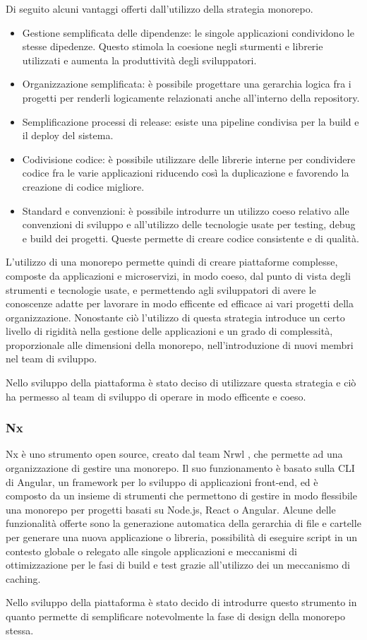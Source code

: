 Di seguito alcuni vantaggi offerti dall'utilizzo della strategia monorepo.\cite{Monorepo}
\begin{itemize}
      \item Gestione semplificata delle dipendenze: le singole applicazioni condividono le stesse dipedenze.
            Questo stimola la coesione negli sturmenti e librerie utilizzati e
            aumenta la produttività degli sviluppatori.
      \item Organizzazione semplificata: è possibile progettare una
            gerarchia logica fra i progetti per renderli logicamente
            relazionati anche all'interno della repository.
      \item Semplificazione processi di release: esiste una pipeline condivisa per la build e il deploy del sistema.
      \item Codivisione codice: è possibile utilizzare delle librerie interne per condividere codice fra le varie applicazioni riducendo
            così la duplicazione e favorendo la creazione di codice migliore.
      \item Standard e convenzioni: è possibile introdurre un utilizzo coeso relativo alle convenzioni di sviluppo e all'utilizzo delle tecnologie
            usate per testing, debug e build dei progetti. Queste permette di creare codice consistente e di qualità.

\end{itemize}
L'utilizzo di una monorepo permette quindi di creare piattaforme complesse, composte da applicazioni e microservizi, in modo
coeso, dal punto di vista degli strumenti e tecnologie usate, e permettendo agli sviluppatori di avere le conoscenze adatte per lavorare
in modo efficente ed efficace ai vari progetti della organizzazione.
Nonostante ciò l'utilizzo di questa strategia introduce un certo livello di rigidità nella gestione delle applicazioni e un
grado di complessità, proporzionale alle dimensioni della monorepo, nell'introduzione di nuovi membri nel team di sviluppo.

Nello sviluppo della piattaforma è stato deciso di utilizzare questa strategia e ciò ha permesso
al team di sviluppo di operare in modo efficente e coeso.

\subsubsection{Nx}
Nx \cite{Nx} è uno strumento open source, creato dal team Nrwl \cite{Nrwl}, che permette ad una organizzazione
di gestire una monorepo.
Il suo funzionamento è basato sulla CLI di Angular, un framework per lo sviluppo di applicazioni front-end,
ed è composto da un insieme di strumenti che permettono di gestire in modo flessibile una monorepo per progetti basati
su Node.js, React o Angular. Alcune delle funzionalità offerte sono la generazione automatica della gerarchia di file e cartelle
per generare una nuova applicazione o libreria, possibilità di eseguire script in un contesto globale o relegato alle singole applicazioni
e meccanismi di ottimizzazione per le fasi di build e test grazie all'utilizzo dei un meccanismo di caching.

Nello sviluppo della piattaforma è stato decido di introdurre questo strumento in quanto permette di semplificare
notevolmente la fase di design della monorepo stessa.
